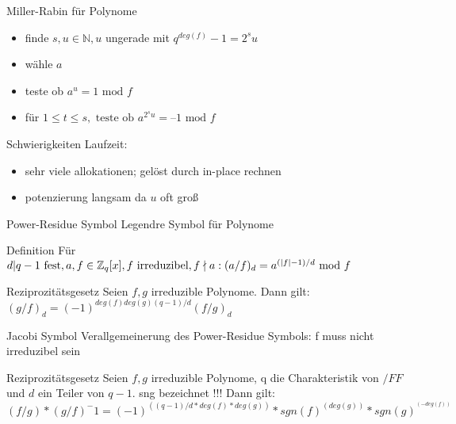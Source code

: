 \documentclass[german,10pt,xcolor=colortbl,compress]{beamer}%
\newcommand{\ZZ}{\mathbb{Z}}
\newcommand{\NN}{\mathbb{N}}
\begin{document}
	\begin{frame}{Miller-Rabin für Polynome}
		\begin{itemize}
			\item finde $s,u \in \NN,u $ ungerade mit $q^{deg(f)}-1=2^su $
			\item wähle $a$ 
			\item teste ob $a^u = 1 \text{ mod } f$
			\item für $1\leq t\leq s, \text{ teste ob } a^{2^s u} = \text{--}1 \text{ mod } f$
			
		\end{itemize}		
	\end{frame}

	\begin{frame}{Schwierigkeiten}
		Laufzeit: 
		
		\begin{itemize}
			\item sehr viele allokationen; gelöst durch in-place rechnen
			\item potenzierung langsam da $u$ oft groß
		\end{itemize}
	\end{frame}





	
	\begin{frame}{Power-Residue Symbol}
		Legendre Symbol für Polynome 
		\begin{block}{Definition}
			Für $d|q-1 \text{ fest},  a,f \in \ZZ_q[x], f \text{ irreduzibel}, f \nmid a :
		\newline 	(a/f)_d = a^{(|f|-1)/d} \text{ mod } f $
			 
		\end{block}
	
		\begin{block}{Reziprozitätsgesetz}
			Seien $f,g$ irreduzible Polynome. Dann gilt:
				$(g/f)_d=(-1)^{deg(f)deg(g)(q-1)/d} (f/g)_d $ 				
		\end{block}
	\end{frame}

	
	\begin{frame}{Jacobi Symbol}
		Verallgemeinerung des Power-Residue Symbols: f muss nicht irreduzibel sein
		
		
		\begin{block}{Reziprozitätsgesetz}
			Seien $f,g$ irreduzible Polynome, q die Charakteristik von $/FF$ und $d$ ein Teiler von $q-1$.
			sng bezeichnet !!!
			Dann gilt:
			$(f/g)*(g/f)^-1 = (-1)^((q-1)/d * deg(f)*deg(g))*sgn(f)^(deg(g))*sgn(g)^^(-deg(f)) $
							
		\end{block}
	\end{frame}
\end{document}
